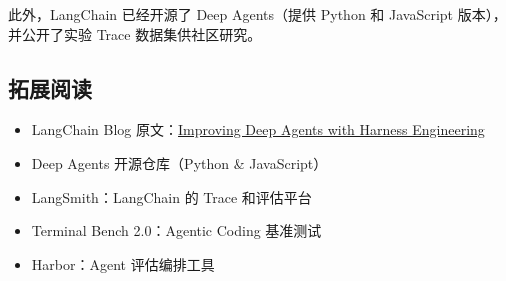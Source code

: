 \documentclass[a4paper]{article}
\begin{document}
此外，LangChain 已经开源了 Deep Agents（提供 Python 和 JavaScript 版本），并公开了实验 Trace 数据集供社区研究。

\subsection{拓展阅读}

\begin{itemize}[leftmargin=1.5em]
    \item LangChain Blog 原文：\href{https://blog.langchain.com/improving-deep-agents-with-harness-engineering/}{Improving Deep Agents with Harness Engineering}
    \item Deep Agents 开源仓库（Python \& JavaScript）
    \item LangSmith：LangChain 的 Trace 和评估平台
    \item Terminal Bench 2.0：Agentic Coding 基准测试
    \item Harbor：Agent 评估编排工具
\end{itemize}

\end{document}
